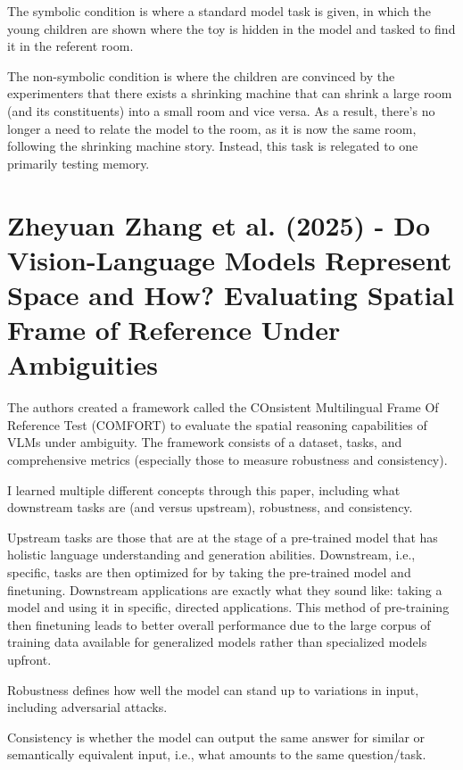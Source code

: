 \documentclass[12pt, letterpaper]{article}
\begin{document}
\begin{spacing}{1.10}
The symbolic condition is where a standard model task is given, in which the young children are shown where the toy is hidden in the model and tasked to find it in the referent room.
\break

The non-symbolic condition is where the children are convinced by the experimenters that there exists a shrinking machine that can shrink a large room (and its constituents) into a small room and vice versa. As a result, there's no longer a need to relate the model to the room, as it is now the same room, following the shrinking machine story. Instead, this task is relegated to one primarily testing memory.

\section[Zhang et al. - Do Vision-Language Models Represent Space and How?]{Zheyuan Zhang et al. (2025) - Do Vision-Language Models Represent Space and How? Evaluating Spatial Frame of Reference Under Ambiguities \cite{Zhang2025DoVLMs}}
\label{sec:Zhang 2025 Spatial Comfort}
\leavevmode\par
The authors created a framework called the COnsistent Multilingual Frame Of Reference Test (COMFORT) to evaluate the spatial reasoning capabilities of VLMs under ambiguity. The framework consists of a dataset, tasks, and comprehensive metrics (especially those to measure robustness and consistency).

I learned multiple different concepts through this paper, including what downstream tasks are (and versus upstream), robustness, and consistency.

Upstream tasks are those that are at the stage of a pre-trained model that has holistic language understanding and generation abilities. Downstream, i.e., specific, tasks are then optimized for by taking the pre-trained model and finetuning. Downstream applications are exactly what they sound like: taking a model and using it in specific, directed applications. This method of pre-training then finetuning leads to better overall performance due to the large corpus of training data available for generalized models rather than specialized models upfront.

Robustness defines how well the model can stand up to variations in input, including adversarial attacks.

Consistency is whether the model can output the same answer for similar or semantically equivalent input, i.e., what amounts to the same question/task.


\end{spacing}
\end{document}
